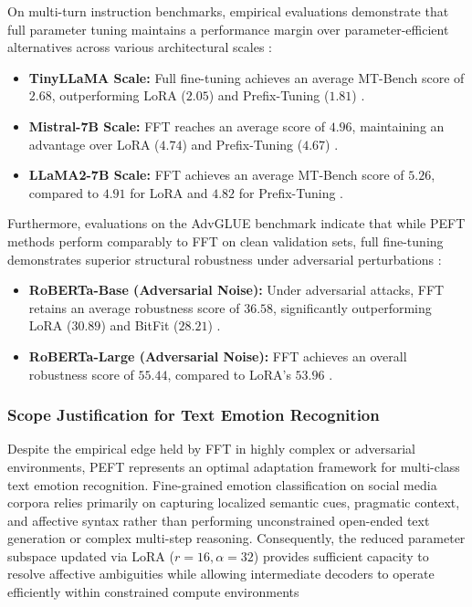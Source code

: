 \documentclass[conference]{IEEEtran}
\begin{document}
On multi-turn instruction benchmarks, empirical evaluations demonstrate that full parameter tuning maintains a performance margin over parameter-efficient alternatives across various architectural scales \cite{liu-etal-2026-look}:
\begin{itemize}
    \item \textbf{TinyLLaMA Scale:} Full fine-tuning achieves an average MT-Bench score of $2.68$, outperforming LoRA ($2.05$) and Prefix-Tuning ($1.81$) \cite{liu-etal-2026-look}.
    \item \textbf{Mistral-7B Scale:} FFT reaches an average score of $4.96$, maintaining an advantage over LoRA ($4.74$) and Prefix-Tuning ($4.67$) \cite{liu-etal-2026-look}.
    \item \textbf{LLaMA2-7B Scale:} FFT achieves an average MT-Bench score of $5.26$, compared to $4.91$ for LoRA and $4.82$ for Prefix-Tuning \cite{liu-etal-2026-look}.
\end{itemize}

Furthermore, evaluations on the AdvGLUE benchmark indicate that while PEFT methods perform comparably to FFT on clean validation sets, full fine-tuning demonstrates superior structural robustness under adversarial perturbations \cite{liu-etal-2026-look}:
\begin{itemize}
    \item \textbf{RoBERTa-Base (Adversarial Noise):} Under adversarial attacks, FFT retains an average robustness score of $36.58$, significantly outperforming LoRA ($30.89$) and BitFit ($28.21$) \cite{liu-etal-2026-look}.
    \item \textbf{RoBERTa-Large (Adversarial Noise):} FFT achieves an overall robustness score of $55.44$, compared to LoRA's $53.96$ \cite{liu-etal-2026-look}.
\end{itemize}

\subsubsection{Scope Justification for Text Emotion Recognition}
Despite the empirical edge held by FFT in highly complex or adversarial environments, PEFT represents an optimal adaptation framework for multi-class text emotion recognition. Fine-grained emotion classification on social media corpora relies primarily on capturing localized semantic cues, pragmatic context, and affective syntax rather than performing unconstrained open-ended text generation or complex multi-step reasoning. Consequently, the reduced parameter subspace updated via LoRA ($r=16, \alpha=32$) provides sufficient capacity to resolve affective ambiguities while allowing intermediate decoders to operate efficiently within constrained compute environments \cite{nwaiwu2025peft}
\end{document}
